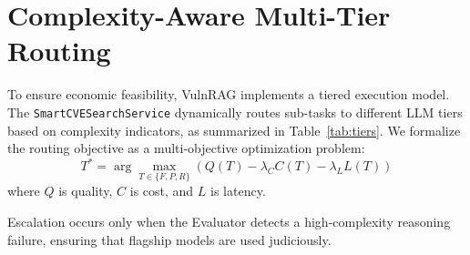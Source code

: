 \section{Complexity-Aware Multi-Tier Routing}
\label{sec:routing}
To ensure economic feasibility, VulnRAG implements a tiered execution model. The \texttt{SmartCVESearchService} dynamically routes sub-tasks to different LLM tiers based on complexity indicators, as summarized in Table~\ref{tab:tiers}. We formalize the routing objective as a multi-objective optimization problem:
\begin{equation}
T^* = \arg \max_{T \in \{F, P, R\}} (Q(T) - \lambda_C C(T) - \lambda_L L(T))
\label{eq:routing}
\end{equation}
where $Q$ is quality, $C$ is cost, and $L$ is latency.

\begin{table}[htbp]
    \centering
    \caption{LLM Tier Characteristics and Routing Indicators}
    \label{tab:tiers}
    \resizebox{\columnwidth}{!}{}
\end{table}

Escalation occurs only when the Evaluator detects a high-complexity reasoning failure, ensuring that flagship models are used judiciously.
